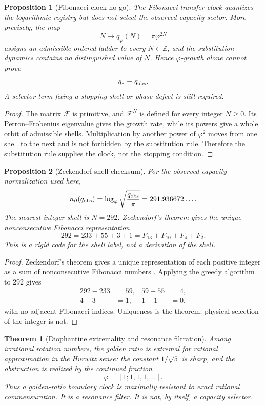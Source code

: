 \documentclass[aps,prd,reprint,nofootinbib,superscriptaddress,floatfix]{revtex4-2}
\numberwithin{equation}{section}
\theoremstyle{definition}
\theoremstyle{plain}
\newtheorem{theorem}{Theorem}[section]
\newtheorem{proposition}{Proposition}[section]
\begin{document}
\begin{proposition}[Fibonacci clock no-go]
The Fibonacci transfer clock quantizes the logarithmic registry but does
not select the observed capacity sector.  More precisely, the map
\[
N\longmapsto q_\varphi(N)=\pi\varphi^{2N}
\]
assigns an admissible ordered ladder to every \(N\in\mathbb Z\), and the
substitution dynamics contains no distinguished value of \(N\).  Hence
\(\varphi\)-growth alone cannot prove
\[
q_*=q_{\rm obs}.
\]
A selector term fixing a stopping shell or phase defect is still required.
\end{proposition}

\begin{proof}
The matrix \({\mathcal F}\) is primitive, and
\({\mathcal F}^N\) is defined for every integer \(N\ge0\).  Its
Perron--Frobenius eigenvalue gives the growth rate, while its powers give
a whole orbit of admissible shells.  Multiplication by another power of
\(\varphi^2\) moves from one shell to the next and is not forbidden by the
substitution rule.  Therefore the substitution rule supplies the clock,
not the stopping condition.
\end{proof}

\begin{proposition}[Zeckendorf shell checksum]
For the observed capacity normalization used here,
\[
n_\partial(q_{\rm obs})
=
\log_\varphi\sqrt{\frac{q_{\rm obs}}{\pi}}
=
291.936672\ldots .
\]
The nearest integer shell is \(N=292\).  Zeckendorf's theorem gives the
unique nonconsecutive Fibonacci representation
\begin{equation}
\boxed{
292=233+55+3+1=F_{13}+F_{10}+F_4+F_2 .
}
\end{equation}
This is a rigid code for the shell label, not a derivation of the shell.
\end{proposition}

\begin{proof}
Zeckendorf's theorem gives a unique representation of each positive
integer as a sum of nonconsecutive Fibonacci numbers \cite{Zeckendorf1972,HardyWright2008}.
Applying the greedy algorithm to \(292\) gives
\begin{align*}
292-233&=59,&
59-55&=4,\\
4-3&=1,&
1-1&=0 .
\end{align*}
with no adjacent Fibonacci indices.  Uniqueness is the theorem; physical
selection of the integer is not.
\end{proof}

\begin{theorem}[Diophantine extremality and resonance filtration]
Among irrational rotation numbers, the golden ratio is extremal for
rational approximation in the Hurwitz sense: the constant \(1/\sqrt5\)
is sharp, and the obstruction is realized by the continued fraction
\[
\varphi=[1;1,1,1,\ldots].
\]
Thus a golden-ratio boundary clock is maximally resistant to exact
rational commensuration.  It is a resonance filter.  It is not, by itself,
a capacity selector.
\end{theorem}
\end{document}
